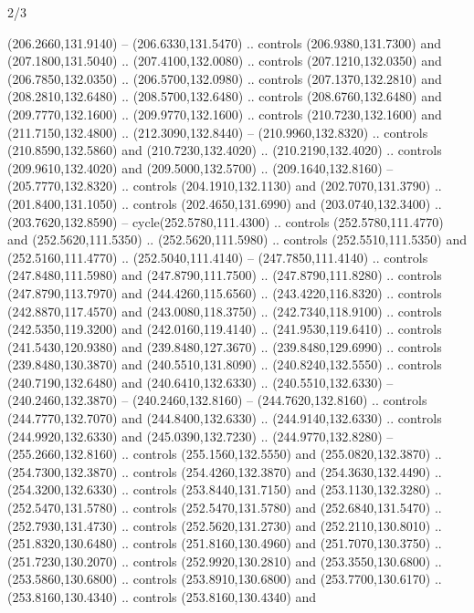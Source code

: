 \begin{flagdescription}{2/3}
\begin{scope}[xshift=0.5\flaglength,yshift=0.5\flagwidth,scale=\flagwidth/259.2]
\begin{scope}[y=0.8pt, x=0.8pt, yscale=-1,shift={(-243,-162)}]
      (206.2660,131.9140) -- (206.6330,131.5470) .. controls (206.9380,131.7300) and
      (207.1800,131.5040) .. (207.4100,132.0080) .. controls (207.1210,132.0350) and
      (206.7850,132.0350) .. (206.5700,132.0980) .. controls (207.1370,132.2810) and
      (208.2810,132.6480) .. (208.5700,132.6480) .. controls (208.6760,132.6480) and
      (209.7770,132.1600) .. (209.9770,132.1600) .. controls (210.7230,132.1600) and
      (211.7150,132.4800) .. (212.3090,132.8440) -- (210.9960,132.8320) .. controls
      (210.8590,132.5860) and (210.7230,132.4020) .. (210.2190,132.4020) .. controls
      (209.9610,132.4020) and (209.5000,132.5700) .. (209.1640,132.8160) --
      (205.7770,132.8320) .. controls (204.1910,132.1130) and (202.7070,131.3790) ..
      (201.8400,131.1050) .. controls (202.4650,131.6990) and (203.0740,132.3400) ..
      (203.7620,132.8590) -- cycle(252.5780,111.4300) .. controls
      (252.5780,111.4770) and (252.5620,111.5350) .. (252.5620,111.5980) .. controls
      (252.5510,111.5350) and (252.5160,111.4770) .. (252.5040,111.4140) --
      (247.7850,111.4140) .. controls (247.8480,111.5980) and (247.8790,111.7500) ..
      (247.8790,111.8280) .. controls (247.8790,113.7970) and (244.4260,115.6560) ..
      (243.4220,116.8320) .. controls (242.8870,117.4570) and (243.0080,118.3750) ..
      (242.7340,118.9100) .. controls (242.5350,119.3200) and (242.0160,119.4140) ..
      (241.9530,119.6410) .. controls (241.5430,120.9380) and (239.8480,127.3670) ..
      (239.8480,129.6990) .. controls (239.8480,130.3870) and (240.5510,131.8090) ..
      (240.8240,132.5550) .. controls (240.7190,132.6480) and (240.6410,132.6330) ..
      (240.5510,132.6330) -- (240.2460,132.3870) -- (240.2460,132.8160) --
      (244.7620,132.8160) .. controls (244.7770,132.7070) and (244.8400,132.6330) ..
      (244.9140,132.6330) .. controls (244.9920,132.6330) and (245.0390,132.7230) ..
      (244.9770,132.8280) -- (255.2660,132.8160) .. controls (255.1560,132.5550) and
      (255.0820,132.3870) .. (254.7300,132.3870) .. controls (254.4260,132.3870) and
      (254.3630,132.4490) .. (254.3200,132.6330) .. controls (253.8440,131.7150) and
      (253.1130,132.3280) .. (252.5470,131.5780) .. controls (252.5470,131.5780) and
      (252.6840,131.5470) .. (252.7930,131.4730) .. controls (252.5620,131.2730) and
      (252.2110,130.8010) .. (251.8320,130.6480) .. controls (251.8160,130.4960) and
      (251.7070,130.3750) .. (251.7230,130.2070) .. controls (252.9920,130.2810) and
      (253.3550,130.6800) .. (253.5860,130.6800) .. controls (253.8910,130.6800) and
      (253.7700,130.6170) .. (253.8160,130.4340) .. controls (253.8160,130.4340) and

\end{scope}
\end{scope}
\end{flagdescription}
